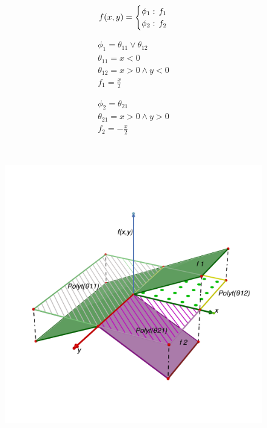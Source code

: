 \vspace{-5mm}
\begin{figure}[ht!]
\begin{minipage}{0.15\textwidth}
{\scriptsize
\begin{align*}
f(x,y)= 
\begin{cases}
  \phi_1:& \hspace{-2mm} f_1\\ 
  \phi_2: & \hspace{-2mm}f_2\\ 
\end{cases}
\end{align*} }
\end{minipage}
\begin{minipage}{0.15\textwidth}
{\scriptsize
\begin{align*}
 \phi_1 = \theta_{11}\vee \theta_{12}\\
\theta_{11} = x<0 \\
\theta_{12} = x>0 \wedge y<0 \\
 f_1 = \displaystyle \frac{x}{2} 
\end{align*} }
\end{minipage}
\begin{minipage}{0.15\textwidth}
{\scriptsize
\begin{align*}
\phi_2 = \theta_{21}\\
\theta_{21} = x>0 \wedge y>0\\
f_2 = \displaystyle -\frac{x}{2}
\end{align*} }
\end{minipage}\\
\begin{minipage}{0.3\textwidth}
\center
\vspace{-13mm}
\includegraphics[trim = 1cm 0cm 1cm 0cm,width=\textwidth]{Figures/stepfun/PiecewiseLinearEx.pdf} 

\end{minipage}
\end{figure}
